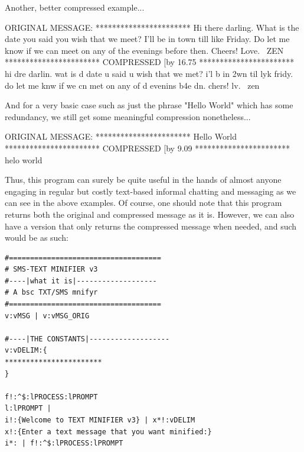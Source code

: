 \documentclass[a4paper, 18pt]{book} %
\begin{document}
{{{  
  Another, better compressed example...
  
  
     \begin{tcbverbatim}[title=Sample OUTPUT 2 from TEXT MINIFIER]
ORIGINAL MESSAGE:
***********************
Hi there darling. What is the date you said you wish that we meet? I'll be in town till like Friday. Do let me know if we can meet on any of the evenings before then. Cheers! Love. ~ZEN
***********************
COMPRESSED [by 16.75%
***********************
hi dre darlin. wat is d date u said u wish that we met? i'l b in 2wn til lyk fridy. do let me knw if we cn met on any of d evenins b4e dn. chers! lv. ~zen
  \end{tcbverbatim}


And for a very basic case such as just the phrase "Hello World" which has some redundancy, we still get some meaningful compression nonetheless...


     \begin{tcbverbatim}[title=Sample OUTPUT 3 from TEXT MINIFIER]
ORIGINAL MESSAGE:
***********************
Hello World
***********************
COMPRESSED [by 9.09%
***********************
helo world
  \end{tcbverbatim}
  
  
Thus, this program can surely be quite useful in the hands of almost anyone engaging in regular but costly text-based informal chatting and messaging as we can see in the above examples. Of course, one should note that this program returns both the original and compressed message as it is. However, we can also have a version that only returns the compressed message when needed, and such would be as such:


\vspace{2em}


{
 \Large
  \begin{tcolorbox}[teaterminalstyle, title=TEA Program:  SMS-TEXT MINIFIER v3, breakable]
  \begin{lstlisting}[language=TEA,breaklines=true,]
#====================================
# SMS-TEXT MINIFIER v3
#----|what it is|-------------------
# A bsc TXT/SMS mnifyr
#====================================
v:vMSG | v:vMSG_ORIG

#----|THE CONSTANTS|-------------------
v:vDELIM:{
***********************
}

f!:^$:lPROCESS:lPROMPT
l:lPROMPT | 
i!:{Welcome to TEXT MINIFIER v3} | x*!:vDELIM 
x!:{Enter a text message that you want minified:}
i*: | f!:^$:lPROCESS:lPROMPT


\end{lstlisting}
\end{tcolorbox}}}}}
\end{document}
